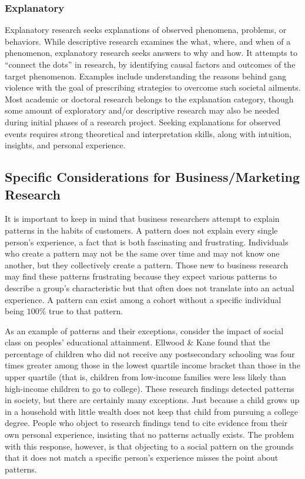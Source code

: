 \subsubsection{Explanatory}

Explanatory research seeks explanations of observed phenomena, problems, or behaviors. While descriptive research examines the what, where, and when of a phenomenon, explanatory research seeks answers to why and how. It attempts to ``connect the dots'' in research, by identifying causal factors and outcomes of the target phenomenon. Examples include understanding the reasons behind gang violence with the goal of prescribing strategies to overcome such societal ailments. Most academic or doctoral research belongs to the explanation category, though some amount of exploratory and/or descriptive research may also be needed during initial phases of a research project. Seeking explanations for observed events requires strong theoretical and interpretation skills, along with intuition, insights, and personal experience.

\subsection{Specific Considerations for Business/Marketing Research}

It is important to keep in mind that business researchers attempt to explain patterns in the habits of customers. A pattern does not explain every single person's experience, a fact that is both fascinating and frustrating. Individuals who create a pattern may not be the same over time and may not know one another, but they collectively create a pattern. Those new to business research may find these patterns frustrating because they expect various patterns to describe a group's characteristic but that often does not translate into an actual experience. A pattern can exist among a cohort without a specific individual being $ 100\% $ true to that pattern.

As an example of patterns and their exceptions, consider the impact of social class on peoples' educational attainment. Ellwood \& Kane\cite{ellwood2000getting} found that the percentage of children who did not receive any postsecondary schooling was four times greater among those in the lowest quartile income bracket than those in the upper quartile (that is, children from low-income families were less likely than high-income children to go to college). These research findings detected patterns in society, but there are certainly many exceptions. Just because a child grows up in a household with little wealth does not keep that child from pursuing a college degree. People who object to research findings tend to cite evidence from their own personal experience, insisting that no patterns actually exists. The problem with this response, however, is that objecting to a social pattern on the grounds that it does not match a specific person's experience misses the point about patterns.

